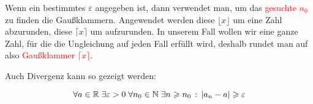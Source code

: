 \documentclass[main.tex]{subfiles}
\begin{document}
\begin{Bemerkung}
Wenn ein bestimmtes $\varepsilon$ angegeben ist, dann verwendet man, um das \textcolor{red}{gesuchte $n_0$} zu finden die Gaußklammern. Angewendet werden diese $\lfloor x \rfloor$ um eine Zahl abzurunden, diese $\lceil x \rceil$ um aufzurunden. In unserem Fall wollen wir eine ganze Zahl, für die die Ungleichung auf jeden Fall erfüllt wird, deshalb rundet man auf also \textcolor{red}{Gaußklammer $\lceil x \rceil$}.
\end{Bemerkung}

\begin{Bemerkung}
\begin{center}Auch Divergenz kann so gezeigt werden:\end{center}
$$\forall a \in \mathbb{R} \;\exists \varepsilon >0\; \forall n_0 \in\mathbb{N} \;\exists n\geqslant n_0\,:\, |a_n-a|\geqslant \varepsilon$$
\end{Bemerkung}
\end{document}
